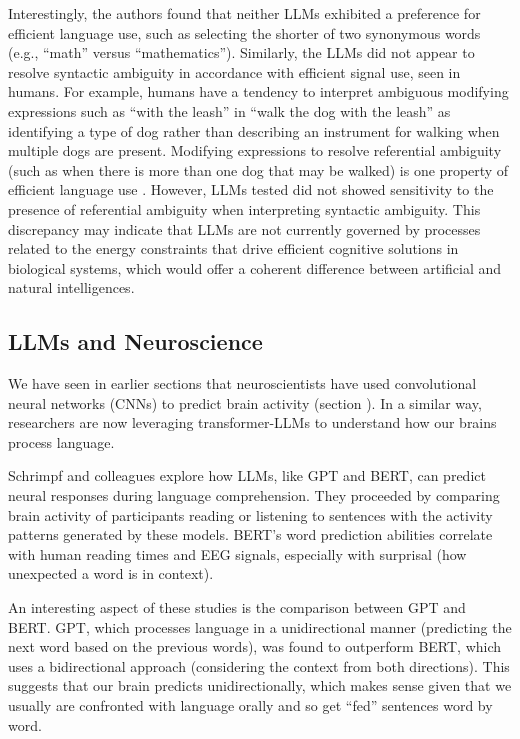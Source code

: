 Interestingly, the authors found that neither LLMs exhibited a preference for efficient language use, such as selecting the shorter of two synonymous words (e.g., ``math'' versus ``mathematics''). Similarly, the LLMs did not appear to resolve syntactic ambiguity in accordance with efficient signal use, seen in humans. For example, humans have a tendency to interpret ambiguous modifying expressions such as ``with the leash'' in ``walk the dog with the leash'' as identifying a type of dog rather than describing an instrument for walking when multiple dogs are present. Modifying expressions to resolve referential ambiguity (such as when there is more than one dog that may be walked) is one property of efficient language use \cite{frank2012predicting}. However, LLMs tested did not showed sensitivity to the presence of referential ambiguity when interpreting syntactic ambiguity. This discrepancy may indicate that LLMs are not currently governed by processes related to the energy constraints that drive efficient cognitive solutions in biological systems, which would offer a coherent difference between artificial and natural intelligences.

\subsection{LLMs and Neuroscience}


We have seen in earlier sections that neuroscientists have used convolutional neural networks (CNNs) to predict brain activity (section ). In a similar way, researchers are now leveraging transformer-LLMs to understand how our brains process language. 

Schrimpf and colleagues \cite{schrimpf2021neural} explore how LLMs, like GPT and BERT, can predict neural responses during language comprehension. They proceeded by comparing brain activity of participants reading or listening to sentences with the activity patterns generated by these models.  BERT’s word prediction abilities correlate with human reading times and EEG signals, especially with surprisal (how unexpected a word is in context). 

An interesting aspect of these studies is the comparison between GPT and BERT. GPT, which processes language in a unidirectional manner (predicting the next word based on the previous words), was found to outperform BERT, which uses a bidirectional approach (considering the context from both directions). This suggests that our brain predicts unidirectionally, which makes sense given that we usually are confronted with language orally and so get ``fed'' sentences word by word. 


